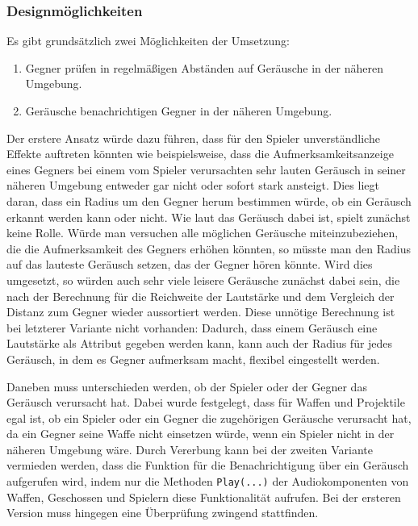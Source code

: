 {\subsubsection{Designmöglichkeiten}
Es gibt grundsätzlich zwei Möglichkeiten der Umsetzung:
\begin{enumerate}
	\item Gegner prüfen in regelmäßigen Abständen auf Geräusche in der näheren Umgebung.
	\item Geräusche benachrichtigen Gegner in der näheren Umgebung.
\end{enumerate}

Der erstere Ansatz würde dazu führen, dass für den Spieler unverständliche Effekte auftreten könnten wie beispielsweise, dass die Aufmerksamkeitsanzeige eines Gegners bei einem vom Spieler verursachten sehr lauten Geräusch in seiner näheren Umgebung entweder gar nicht oder sofort stark ansteigt. Dies liegt daran, dass ein Radius um den Gegner herum bestimmen würde, ob ein Geräusch erkannt werden kann oder nicht. Wie laut das Geräusch dabei ist, spielt zunächst keine Rolle. Würde man versuchen alle möglichen Geräusche miteinzubeziehen, die die Aufmerksamkeit des Gegners erhöhen könnten, so müsste man den Radius auf das lauteste Geräusch setzen, das der Gegner hören könnte. Wird dies umgesetzt, so würden auch sehr viele leisere Geräusche zunächst dabei sein, die nach der Berechnung für die Reichweite der Lautstärke und dem Vergleich der Distanz zum Gegner wieder aussortiert werden. %
Diese unnötige Berechnung ist bei letzterer Variante nicht vorhanden: Dadurch, dass einem Geräusch eine Lautstärke  als Attribut gegeben werden kann, kann auch der Radius für jedes Geräusch, in dem es Gegner aufmerksam macht, flexibel eingestellt werden.   

Daneben muss unterschieden werden, ob der Spieler oder der Gegner das Geräusch verursacht hat. Dabei wurde festgelegt, dass für Waffen und Projektile egal ist, ob ein Spieler oder ein Gegner die zugehörigen Geräusche verursacht hat, da ein Gegner seine Waffe nicht einsetzen würde, wenn ein Spieler nicht in der näheren Umgebung wäre. Durch Vererbung kann bei der zweiten Variante vermieden werden, dass die Funktion für die Benachrichtigung über ein Geräusch aufgerufen wird, indem nur die Methoden \texttt{Play(...)} der Audiokomponenten von Waffen, Geschossen und Spielern diese Funktionalität aufrufen. Bei der ersteren Version muss hingegen eine Überprüfung zwingend stattfinden.

}
